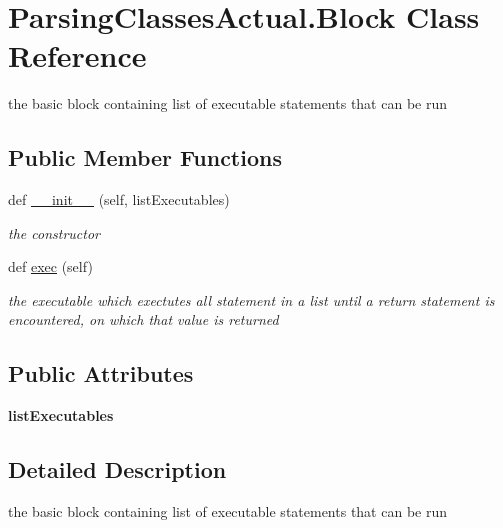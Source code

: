 \hypertarget{class_parsing_classes_actual_1_1_block}{}\section{Parsing\+Classes\+Actual.\+Block Class Reference}
\label{class_parsing_classes_actual_1_1_block}


the basic block containing list of executable statements that can be run  


\subsection*{Public Member Functions}
\begin{DoxyCompactItemize}
\item 
def \hyperlink{class_parsing_classes_actual_1_1_block_ac422058e3330cd4d72e14a3691037415}{\+\_\+\+\_\+init\+\_\+\+\_\+} (self, list\+Executables)
\begin{DoxyCompactList}\small\item\em the constructor \end{DoxyCompactList}\item 
def \hyperlink{class_parsing_classes_actual_1_1_block_a9023ee93ba05105f1f9fe5f3014c347f}{exec} (self)\hypertarget{class_parsing_classes_actual_1_1_block_a9023ee93ba05105f1f9fe5f3014c347f}{}\label{class_parsing_classes_actual_1_1_block_a9023ee93ba05105f1f9fe5f3014c347f}

\begin{DoxyCompactList}\small\item\em the executable which exectutes all statement in a list until a return statement is encountered, on which that value is returned \end{DoxyCompactList}\end{DoxyCompactItemize}
\subsection*{Public Attributes}
\begin{DoxyCompactItemize}
\item 
{\bfseries list\+Executables}\hypertarget{class_parsing_classes_actual_1_1_block_aac2c93f155a9e39693fd55cf62c5003d}{}\label{class_parsing_classes_actual_1_1_block_aac2c93f155a9e39693fd55cf62c5003d}

\end{DoxyCompactItemize}


\subsection{Detailed Description}
the basic block containing list of executable statements that can be run 

